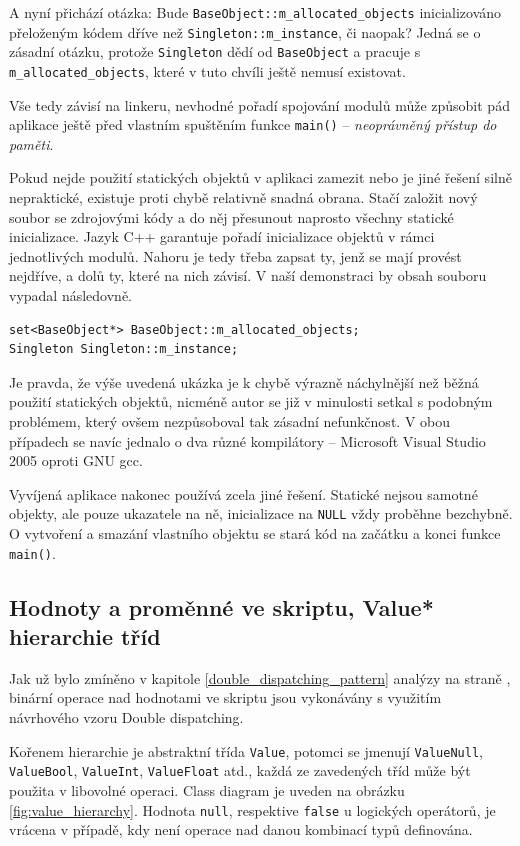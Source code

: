 \documentclass[11pt,twoside,a4paper]{book}
\begin{document}
A nyní přichází otázka: Bude \texttt{BaseObject::m\_allocated\_objects} inicializováno přeloženým kódem dříve než \texttt{Singleton::m\_instance}, či naopak? Jedná se o zásadní otázku, protože \texttt{Singleton} dědí od \texttt{BaseObject} a pracuje s \texttt{m\_allocated\_objects}, které v tuto chvíli ještě nemusí existovat.

Vše tedy závisí na linkeru, nevhodné pořadí spojování modulů může způsobit pád aplikace ještě před vlastním spuštěním funkce \texttt{main()} -- \textit{neoprávněný přístup do paměti}.

Pokud nejde použití statických objektů v aplikaci zamezit nebo je jiné řešení silně nepraktické, existuje proti chybě relativně snadná obrana. Stačí založit nový soubor se zdrojovými kódy a do něj přesunout naprosto všechny statické inicializace. Jazyk C++ garantuje pořadí inicializace objektů v rámci jednotlivých modulů. Nahoru je tedy třeba zapsat ty, jenž se mají provést nejdříve, a dolů ty, které na nich závisí. V naší demonstraci by obsah souboru vypadal následovně.

\begin{verbatim}
set<BaseObject*> BaseObject::m_allocated_objects;
Singleton Singleton::m_instance;
\end{verbatim}

Je pravda, že výše uvedená ukázka je k chybě výrazně náchylnější než běžná použití statických objektů, nicméně autor se již v minulosti setkal s podobným problémem, který ovšem nezpůsoboval tak zásadní nefunkčnost. V obou případech se navíc jednalo o dva různé kompilátory -- Microsoft Visual Studio 2005 oproti GNU gcc.

Vyvíjená aplikace nakonec používá zcela jiné řešení. Statické nejsou samotné objekty, ale pouze ukazatele na ně, inicializace na \texttt{NULL} vždy proběhne bezchybně. O vytvoření a smazání vlastního objektu se stará kód na začátku a konci funkce \texttt{main()}.


\subsection{Hodnoty a proměnné ve skriptu, Value* hierarchie tříd}

Jak už bylo zmíněno v kapitole \ref{double_dispatching_pattern} analýzy na straně \pageref{double_dispatching_pattern}, binární operace nad hodnotami ve skriptu jsou vykonávány s využitím návrhového vzoru Double dispatching.

Kořenem hierarchie je abstraktní třída \texttt{Value}, potomci se jmenují \texttt{ValueNull}, \texttt{Va\-lue\-Bool}, \texttt{ValueInt}, \texttt{ValueFloat} atd., každá ze zavedených tříd může být použita v libovolné operaci. Class diagram je uveden na obrázku \ref{fig:value_hierarchy}. Hodnota \texttt{null}, respektive \texttt{false} u logických operátorů, je vrácena v případě, kdy není operace nad danou kombinací typů definována.
\end{document}
